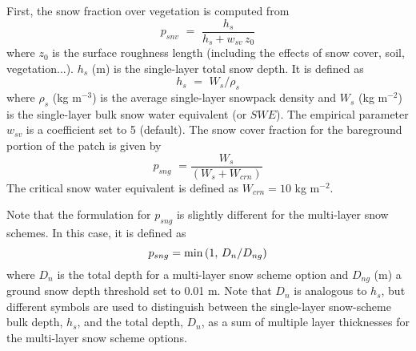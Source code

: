First, the snow fraction over vegetation is computed from
%
\begin{equation}
\label{eq:isba_snow_frac_veg}
p_{snv} \,\, =\,\,  \frac{ h_s }{ h_s + w_{sv} \, z_0 } 
\end{equation}
%
where $z_0$ is the surface roughness length (including the effects of
snow cover, soil, vegetation...).
$h_s$ (m) is the single-layer total snow 
depth. It is defined as 
%
\begin{equation}
%
h_s \,\,=\,\,  W_s / \rho_s
%
\end{equation}
%
where $\rho_s$ (kg m$^{-3}$) is the average single-layer
snowpack density and $W_s$ (kg m$^{-2}$) is the single-layer bulk snow water
equivalent (or $SWE$).
The empirical parameter $w_{sv}$ is a coefficient set to 5 (default). 
%
The snow cover fraction for the bareground portion of the patch is
given by
%
\begin{equation}
\label{eq:isba_snow_frac_ground}
p_{sng} \,\, = \frac{W_s}{\left(W_s + W_{crn}\right)}
%
\end{equation}
%
The critical snow water equivalent is defined as
$W_{crn} = 10$ kg m$^{-2}$.

Note that the formulation for $p_{sng}$ is slightly different for the
multi-layer snow schemes.
In this case, it is defined as
%
\begin{equation}
\label{eq:isba_snow_frac_ground_explicit}
p_{sng} = {\rm min} \left(1,\, D_n/D_{ng} \right) 
\end{equation}
%
where $D_n$ is the total depth for a multi-layer snow scheme option and
$D_{ng}$ (m) a ground snow depth threshold set to 0.01 m.
Note that $D_n$ is analogous to $h_s$, but different symbols are used
to distinguish between the single-layer snow-scheme bulk depth, $h_s$, and the
total depth, $D_n$, as a sum of multiple layer thicknesses for the
multi-layer snow scheme options.

